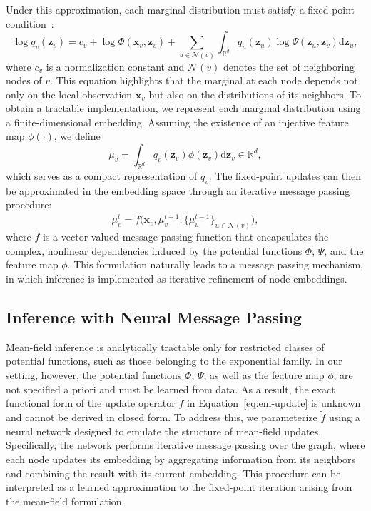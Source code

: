 Under this approximation, each marginal distribution must satisfy a fixed-point condition~\cite{hamilton2020graph}:
\begin{equation}
	\log q_v(\mathbf{z}_v) = c_v + \log \Phi(\mathbf{x}_v, \mathbf{z}_v) + \sum_{u \in \mathcal{N}(v)} \int_{\mathbb{R}^d} q_u(\mathbf{z}_u)\log \Psi(\mathbf{z}_u, \mathbf{z}_v) \mathrm{d}\mathbf{z}_u,
	\label{eq:fixed-point}
\end{equation}
where $c_v$ is a normalization constant and $\mathcal{N}(v)$ denotes the set of neighboring nodes of $v$.
This equation highlights that the marginal at each node depends not only on the local observation $\mathbf{x}_v$ but also on the distributions of its neighbors.
To obtain a tractable implementation, we represent each marginal distribution using a finite-dimensional embedding.
Assuming the existence of an injective feature map $\phi(\cdot)$, we define
\begin{equation}
	\mu_v = \int_{\mathbb{R}^d} q_v(\mathbf{z}_v)\phi(\mathbf{z}_v)\mathrm{d}\mathbf{z}_v \in \mathbb{R}^d,
\end{equation}
which serves as a compact representation of $q_v$.
The fixed-point updates can then be approximated in the embedding space through an iterative message passing procedure:
\begin{equation}
	\mu_v^{t} = \tilde{f}\big(\mathbf{x}_v, \mu_v^{t-1}, \{\mu_u^{t-1}\}_{u \in \mathcal{N}(v)}\big),
	\label{eq:em-update}
\end{equation}
where $\tilde{f}$ is a vector-valued message passing function that encapsulates the complex, nonlinear dependencies induced by the potential functions $\Phi$, $\Psi$, and the feature map $\phi$.
This formulation naturally leads to a message passing mechanism, in which inference is implemented as iterative refinement of node embeddings.

\subsection{Inference with Neural Message Passing}
Mean-field inference is analytically tractable only for restricted classes of potential functions, such as those belonging to the exponential family.
In our setting, however, the potential functions $\Phi$, $\Psi$, as well as the feature map $\phi$, are not specified a priori and must be learned from data.
As a result, the exact functional form of the update operator $\tilde{f}$ in Equation~\ref{eq:em-update} is unknown and cannot be derived in closed form.
To address this, we parameterize $\tilde{f}$ using a neural network designed to emulate the structure of mean-field updates.
Specifically, the network performs iterative message passing over the graph, where each node updates its embedding by aggregating information from its neighbors and combining the result with its current embedding.
This procedure can be interpreted as a learned approximation to the fixed-point iteration arising from the mean-field formulation.

